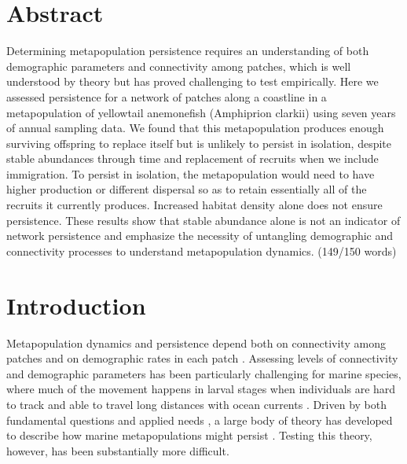 \documentclass[12pt, oneside]{article}   	%
\begin{document}
\section*{Abstract}
Determining metapopulation persistence requires an understanding of both demographic parameters and connectivity among patches, which is well understood by theory but has proved challenging to test empirically. Here we assessed persistence for a network of patches along a coastline in a metapopulation of yellowtail anemonefish (Amphiprion clarkii) using seven years of annual sampling data. We found that this metapopulation produces enough surviving offspring to replace itself but is unlikely to persist in isolation, despite stable abundances through time and replacement of recruits when we include immigration. To persist in isolation, the metapopulation would need to have higher production or different dispersal so as to retain essentially all of the recruits it currently produces. Increased habitat density alone does not ensure persistence. These results show that stable abundance alone is not an indicator of network persistence and emphasize the necessity of untangling demographic and connectivity processes to understand metapopulation dynamics. (149/150 words)



\section*{Introduction}
Metapopulation dynamics and persistence depend both on connectivity among patches and on demographic rates in each patch \citep{hastings_persistence_2006, hanski1998metapopulation}. Assessing levels of connectivity and demographic parameters has been particularly challenging for marine species, where much of the movement happens in larval stages when individuals are hard to track and able to travel long distances with ocean currents \citep{white2019connectivity}. Driven by both fundamental questions and applied needs \citep{botsford_dependence_2001,white_population_2010}, a large body of theory has developed to describe how marine metapopulations might persist \citep{botsford2019population}. Testing this theory, however, has been substantially more difficult.
\end{document}
